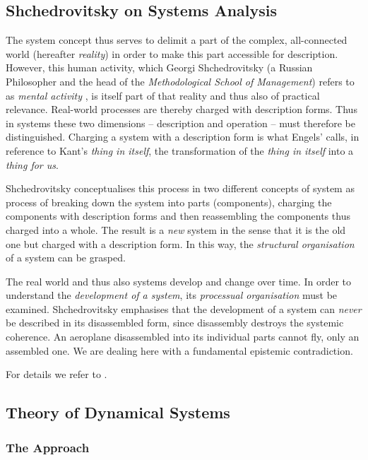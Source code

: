 \documentclass[11pt,a4paper]{article}
\begin{document}
\subsection{Shchedrovitsky on Systems Analysis}

The system concept thus serves to delimit a part of the complex, all-connected
world (hereafter \emph{reality}) in order to make this part accessible for
description. However, this human activity, which Georgi Shchedrovitsky (a
Russian Philosopher and the head of the \emph{Methodological School of
  Management}) refers to as \emph{mental activity} \cite[p. 47]{MSM}, is
itself part of that reality and thus also of practical relevance. Real-world
processes are thereby charged with description forms. Thus in systems these
two dimensions -- description and operation -- must therefore be
distinguished. Charging a system with a description form is what Engels'
calls, in reference to Kant's \emph{thing in itself}, the transformation of
the \emph{thing in itself} into a \emph{thing for us}.

Shchedrovitsky \cite[p. 80 ff.]{MSM} conceptualises this process in two
different concepts of system \cite[pp. 89 and 98]{MSM} as process of breaking
down the system into parts (components), charging the components with
description forms and then reassembling the components thus charged into a
whole.  The result is a \emph{new} system in the sense that it is the old one
but charged with a description form.  In this way, the \emph{structural
  organisation} of a system can be grasped.

The real world and thus also systems develop and change over time. In order to
understand the \emph{development of a system}, its \emph{processual
  organisation} must be examined.  Shchedrovitsky emphasises that the
development of a system can \emph{never} be described in its disassembled
form, since disassembly destroys the systemic coherence. An aeroplane
disassembled into its individual parts cannot fly, only an assembled one. We
are dealing here with a fundamental epistemic contradiction.

For details we refer to \cite{MSM}.

\subsection{Theory of Dynamical Systems}

\subsubsection*{The Approach}
\end{document}
